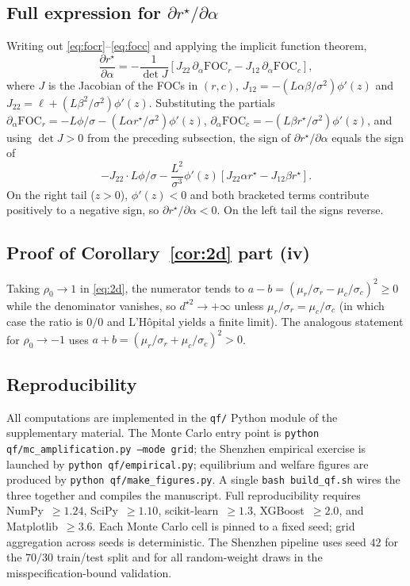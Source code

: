 \documentclass[11pt,a4paper]{article}
\theoremstyle{definition}
\theoremstyle{remark}
\newcommand{\1}{\mathbf{1}}
\begin{document}
\subsection{\texorpdfstring{Full expression for $\partial r^\star/\partial\alpha$}{Full expression for the alpha-derivative of r-star}}
Writing out \eqref{eq:focr}--\eqref{eq:focc} and applying the implicit function theorem,
\[
\frac{\partial r^\star}{\partial\alpha} = -\frac{1}{\det J}\left[J_{22}\,\partial_{\alpha}\mathrm{FOC}_r - J_{12}\,\partial_{\alpha}\mathrm{FOC}_c\right],
\]
where $J$ is the Jacobian of the FOCs in $(r,c)$, $J_{12}=-(L\alpha\beta/\sigma^2)\phi'(z)$ and $J_{22}=\ell+(L\beta^2/\sigma^2)\phi'(z)$. Substituting the partials
$\partial_\alpha\mathrm{FOC}_r = -L\phi/\sigma - (L\alpha r^\star/\sigma^2)\phi'(z)$,
$\partial_\alpha\mathrm{FOC}_c = -(L\beta r^\star/\sigma^2)\phi'(z)$,
and using $\det J>0$ from the preceding subsection, the sign of $\partial r^\star/\partial\alpha$ equals the sign of
\[
-J_{22}\cdot L\phi/\sigma - \frac{L^2}{\sigma^3}\phi'(z)\left[J_{22}\alpha r^\star - J_{12}\beta r^\star\right].
\]
On the right tail ($z>0$), $\phi'(z)<0$ and both bracketed terms contribute positively to a negative sign, so $\partial r^\star/\partial\alpha<0$. On the left tail the signs reverse.

\subsection{Proof of Corollary~\ref{cor:2d} part (iv)}
Taking $\rho_0\to 1$ in \eqref{eq:2d}, the numerator tends to $a-b=(\mu_r/\sigma_r-\mu_c/\sigma_c)^2\ge 0$ while the denominator vanishes, so $d^{\star 2}\to+\infty$ unless $\mu_r/\sigma_r=\mu_c/\sigma_c$ (in which case the ratio is $0/0$ and L'H\^opital yields a finite limit). The analogous statement for $\rho_0\to -1$ uses $a+b=(\mu_r/\sigma_r+\mu_c/\sigma_c)^2>0$.

\subsection{Reproducibility}
All computations are implemented in the \texttt{qf/} Python module of the supplementary material. The Monte Carlo entry point is \texttt{python qf/mc\_amplification.py --mode grid}; the Shenzhen empirical exercise is launched by \texttt{python qf/empirical.py}; equilibrium and welfare figures are produced by \texttt{python qf/make\_figures.py}. A single \texttt{bash build\_qf.sh} wires the three together and compiles the manuscript. Full reproducibility requires NumPy~$\ge 1.24$, SciPy~$\ge 1.10$, scikit-learn~$\ge 1.3$, XGBoost~$\ge 2.0$, and Matplotlib~$\ge 3.6$. Each Monte Carlo cell is pinned to a fixed seed; grid aggregation across seeds is deterministic. The Shenzhen pipeline uses seed $42$ for the $70/30$ train/test split and for all random-weight draws in the misspecification-bound validation.
\end{document}
